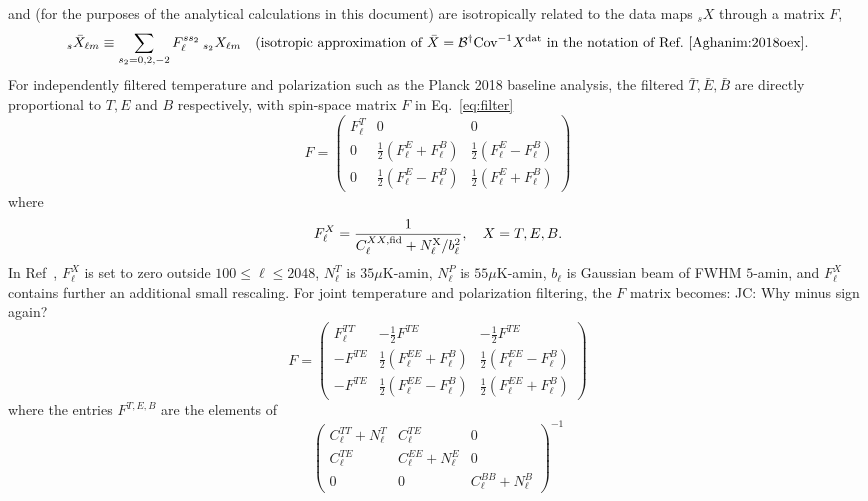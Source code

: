 \documentclass{article}
\newcommand{\Cov}[0]{{\textrm{Cov}}}
\newcommand{\JC}[1]{\color{red}JC: #1\color{black}}
\begin{document}
and (for the purposes of the analytical calculations in this document) are isotropically related to the data maps $_sX$ through a matrix $F$,
\begin{equation}\label{eq:filter}
	_{s}\bar X_{\ell m} \equiv \sum_{s_2 = 0,2,-2}F_\ell^{s s_2} \:_{s_2}X_{\ell m} \quad \textrm{(isotropic approximation of } \bar X = \mathcal B^\dagger \Cov^{-1} X ^\textrm{\rm dat}\textrm{ in the notation of Ref.~\cite{Aghanim:2018oex}}.
\end{equation} 
For independently filtered temperature and polarization such as the Planck 2018 baseline analysis, the filtered $\bar T, \bar E, \bar B$ are directly proportional to $T, E$ and $B$ respectively, with spin-space matrix $F$ in Eq.~\eqref{eq:filter}
\begin{equation}
	F = \begin{pmatrix}
		F^T_\ell & 0 & 0 \\ 0 & \frac 12 \left( F^{E}_\ell  + F^{B}_\ell\right) & \frac 12 \left( F^{E}_\ell  - F^{B}_\ell\right) \\ 0& \frac 12 \left( F^{E}_\ell  - F^{B}_\ell\right) & \frac 12 \left( F^{E}_\ell  + F^{B}_\ell\right)
	\end{pmatrix}
\end{equation}
where
\begin{equation}
F_\ell^{X} = \frac{1}{C_\ell^{XX,\rm fid} + N_\ell^{\rm X} /b_\ell^2}, \quad X = T,E,B.
\end{equation}
In Ref~\cite{Aghanim:2018oex}, $F_\ell^{X}$ is set to zero outside $100 \le \ell \le 2048$, $N^T_\ell$ is $35 \mu$K-amin, $N^P_\ell$ is $55 \mu$K-amin, $b_\ell$ is Gaussian beam of FWHM $5$-amin, and $F_\ell^X$ contains further an additional small rescaling. 
For joint temperature and polarization filtering, the $F$ matrix becomes:
\JC{Why minus sign again?}
\begin{equation}
	F = \begin{pmatrix}
		F^{TT}_\ell &  -\frac 12 F^{TE} &  - \frac12 F^{TE} \\  -F^{TE} & \frac 12 \left( F^{EE}_\ell  + F^{B}_\ell\right) & \frac 12 \left( F^{EE}_\ell  - F^{B}_\ell\right) \\ -F^{TE}& \frac 12 \left( F^{EE}_\ell  - F^{B}_\ell\right) & \frac 12 \left( F^{EE}_\ell  + F^{B}_\ell\right)
	\end{pmatrix}
\end{equation}
where the entries $F^{T, E, B}$ are the elements of
\begin{equation}
 \begin{pmatrix}  C_\ell^{TT} + N_\ell^T &C^{TE}_\ell &  0 \\ C^{TE}_\ell & C_\ell^{EE} + N_\ell^E  & 0\\  0 & 0 &  C_\ell^{BB} + N_\ell^B
 	
 \end{pmatrix}^{-1}
\end{equation}
\end{document}
